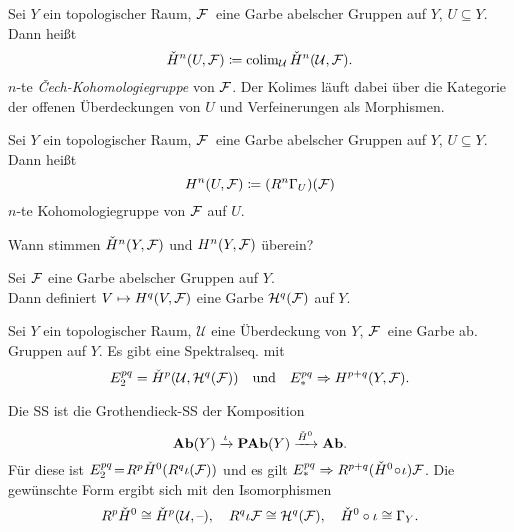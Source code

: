 \documentclass{cheat-sheet}
\begin{document}
\begin{defn}
  Sei $Y$ ein topologischer Raum, $\mathcal{F}$~eine Garbe abelscher Gruppen auf $Y$, $U \subseteq Y$.
  Dann heißt
  \[ \check{H}^n(U, \mathcal{F}) \coloneqq \operatorname{colim}_\mathcal{U} \check{H}^n(\mathcal{U}, \mathcal{F}). \]
  $n$-te \emph{Čech-Kohomologiegruppe} von $\mathcal{F}$.
  Der Kolimes läuft dabei über die Kategorie der offenen Überdeckungen von $U$ und Verfeinerungen als Morphismen.
\end{defn}

\begin{defn}
  Sei $Y$ ein topologischer Raum, $\mathcal{F}$~eine Garbe abelscher Gruppen auf $Y$, $U \subseteq Y$.
  Dann heißt
  \[ H^n(U, \mathcal{F}) \coloneqq (R^n \Gamma_U)(\mathcal{F}) \]
  $n$-te Kohomologiegruppe von $\mathcal{F}$ auf $U$.
\end{defn}

\begin{frage}
  Wann stimmen $\check{H}^n(Y, \mathcal{F})$ und $H^n(Y, \mathcal{F})$ überein?
\end{frage}


\begin{lemdefn}
  Sei $\mathcal{F}$ eine Garbe abelscher Gruppen auf $Y$. \\
  Dann definiert $V \mapsto H^q(V, \mathcal{F})$ eine Garbe \emph{$\mathcal{H}^q(\mathcal{F})$} auf $Y$.
\end{lemdefn}

\begin{thm}
  Sei $Y$ ein topologischer Raum, $\mathcal{U}$ eine Überdeckung von $Y$, $\mathcal{F}$~eine Garbe ab. Gruppen auf $Y$.
  Es gibt eine Spektralseq. mit
  \[
    E^{pq}_2 = \check{H}^p(\mathcal{U}, \mathcal{H}^q(\mathcal{F}))
    \quad \text{und} \quad
    E^{pq}_* \Rightarrow H^{p+q}(Y, \mathcal{F}).
  \]
\end{thm}

\begin{konstr}
  Die SS ist die Grothendieck-SS der Komposition
  \[ \mathbf{Ab}(Y) \xrightarrow{\iota} \mathbf{PAb}(Y) \xrightarrow{\check{H}^0} \mathbf{Ab}. \]
  Für diese ist $E^{pq}_2 \!=\! R^p \check{H}^0 (R^q \iota (\mathcal{F}))$ und es gilt $E^{pq}_* \Rightarrow R^{p+q} (\check{H}^0 \!\circ\! \iota) \mathcal{F}$.
  Die gewünschte Form ergibt sich mit den Isomorphismen
  \[
    R^p \check{H}^0 \cong \check{H}^p(\mathcal{U}, \text{--}), \quad
    R^q \iota \mathcal{F} \cong \mathcal{H}^q(\mathcal{F}), \quad
    \check{H}^0 \circ \iota \cong \Gamma_Y.
  \]
\end{konstr}
\end{document}
